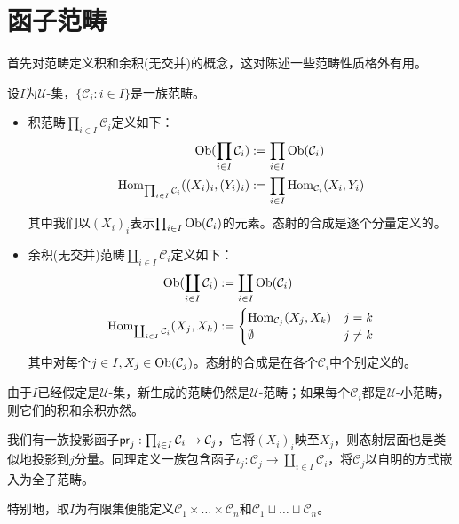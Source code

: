 \section{函子范畴}
    首先对范畴定义积和余积(无交并)的概念，这对陈述一些范畴性质格外有用。
\begin{Def}
    设$I$为$\mathcal{U}$-集，$\{\mathcal{C}_i:i\in I\}$是一族范畴。
    \begin{itemize}
        \item 积范畴$\prod_{i \in I} \mathcal{C}_i$定义如下：
        \begin{align*}
            \operatorname{Ob}(\prod_{i \in I}\mathcal{C}_i) &:=\prod_{i\in I} \operatorname{Ob}(\mathcal{C}_i)  \\
            \operatorname{Hom}_{\prod_{i\in I}\mathcal{C}_i}((X_i)_i, (Y_i)_i) &:=\prod_{i\in I}\operatorname{Hom}_{\mathcal{C}_i}(X_i, Y_i)
        \end{align*}
        其中我们以$(X_i)_i$表示$\prod_{i\in I}\operatorname{Ob}(\mathcal{C}_i)$的元素。态射的合成是逐个分量定义的。

        \item 余积(无交并)范畴$\coprod_{i\in I}\mathcal{C}_i$定义如下：
        \begin{align*}
            \operatorname{Ob}(\coprod_{i\in I}\mathcal{C}_i) &:= \coprod_{i\in I}\operatorname{Ob}(\mathcal{C}_i)    \\
            \operatorname{Hom}_{\coprod_{i\in I}\mathcal{C}_i}(X_j, X_k) &:=
            \begin{cases}
                \operatorname{Hom}_{\mathcal{C}_j}(X_j, X_k) & j=k    \\
                \emptyset & j \neq k
            \end{cases}
        \end{align*}
        其中对每个$j\in I, X_j \in \operatorname{Ob}(\mathcal{C}_j)$。态射的合成是在各个$\mathcal{C}_i$中个别定义的。
    \end{itemize}
    由于$I$已经假定是$\mathcal{U}$-集，新生成的范畴仍然是$\mathcal{U}$-范畴；如果每个$\mathcal{C}_i$都是$\mathcal{U}$-小范畴，则它们的积和余积亦然。

    我们有一族投影函子$\mathsf{pr}_j:\prod_{i \in I}\mathcal{C}_i \to \mathcal{C}_j$，它将$(X_i)_i$映至$X_j$，则态射层面也是类似地投影到$j$分量。同理定义一族包含函子$\iota_j:\mathcal{C}_j \to \coprod_{i \in I}\mathcal{C}_i$，将$\mathcal{C}_j$以自明的方式嵌入为全子范畴。

    特别地，取$I$为有限集便能定义$\mathcal{C}_1 \times \dots \times \mathcal{C}_n$和$\mathcal{C}_1 \sqcup \dots \sqcup \mathcal{C}_n$。

\end{Def}
